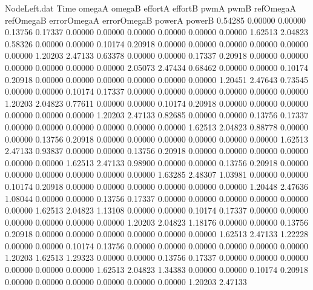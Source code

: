 \begin{filecontents}{NodeLeft.dat}
Time omegaA omegaB effortA effortB pwmA pwmB refOmegaA refOmegaB errorOmegaA errorOmegaB powerA powerB
   0.54285    0.00000    0.00000     0.13756    0.17337    0.00000    0.00000    0.00000    0.00000    0.00000    0.00000    1.62513    2.04823
   0.58326    0.00000    0.00000     0.10174    0.20918    0.00000    0.00000    0.00000    0.00000    0.00000    0.00000    1.20203    2.47133
   0.63378    0.00000    0.00000     0.17337    0.20918    0.00000    0.00000    0.00000    0.00000    0.00000    0.00000    2.05073    2.47434
   0.68462    0.00000    0.00000     0.10174    0.20918    0.00000    0.00000    0.00000    0.00000    0.00000    0.00000    1.20451    2.47643
   0.73545    0.00000    0.00000     0.10174    0.17337    0.00000    0.00000    0.00000    0.00000    0.00000    0.00000    1.20203    2.04823
   0.77611    0.00000    0.00000     0.10174    0.20918    0.00000    0.00000    0.00000    0.00000    0.00000    0.00000    1.20203    2.47133
   0.82685    0.00000    0.00000     0.13756    0.17337    0.00000    0.00000    0.00000    0.00000    0.00000    0.00000    1.62513    2.04823
   0.88778    0.00000    0.00000     0.13756    0.20918    0.00000    0.00000    0.00000    0.00000    0.00000    0.00000    1.62513    2.47133
   0.93837    0.00000    0.00000     0.13756    0.20918    0.00000    0.00000    0.00000    0.00000    0.00000    0.00000    1.62513    2.47133
   0.98900    0.00000    0.00000     0.13756    0.20918    0.00000    0.00000    0.00000    0.00000    0.00000    0.00000    1.63285    2.48307
   1.03981    0.00000    0.00000     0.10174    0.20918    0.00000    0.00000    0.00000    0.00000    0.00000    0.00000    1.20448    2.47636
   1.08044    0.00000    0.00000     0.13756    0.17337    0.00000    0.00000    0.00000    0.00000    0.00000    0.00000    1.62513    2.04823
   1.13108    0.00000    0.00000     0.10174    0.17337    0.00000    0.00000    0.00000    0.00000    0.00000    0.00000    1.20203    2.04823
   1.18176    0.00000    0.00000     0.13756    0.20918    0.00000    0.00000    0.00000    0.00000    0.00000    0.00000    1.62513    2.47133
   1.22228    0.00000    0.00000     0.10174    0.13756    0.00000    0.00000    0.00000    0.00000    0.00000    0.00000    1.20203    1.62513
   1.29323    0.00000    0.00000     0.13756    0.17337    0.00000    0.00000    0.00000    0.00000    0.00000    0.00000    1.62513    2.04823
   1.34383    0.00000    0.00000     0.10174    0.20918    0.00000    0.00000    0.00000    0.00000    0.00000    0.00000    1.20203    2.47133

\end{filecontents}
